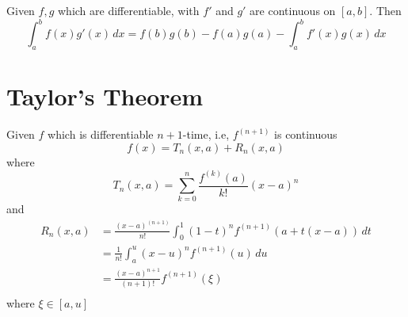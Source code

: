 \begin{theorem*}
  Given $f, g$ which are differentiable, with $f'$ and $g'$ are continuous on $[a, b]$.
  Then 
  \[\int_a^b f(x)g'(x)\,dx = f(b)g(b) - f(a)g(a) - \int_a^b f'(x)g(x)\,dx\]
\end{theorem*}

\section{Taylor's Theorem}
Given $f$ which is differentiable $n+1$-time, i.e, $f^{(n+1)}$ is continuous 
\[f(x) = T_n(x, a) + R_n(x, a)\]
where 
\[T_n(x, a) = \sum_{k=0}^{n} \frac{f^{(k)}(a)}{k!}(x-a)^n\]
and
\begin{align*}
  R_n(x, a) &= \frac{(x-a)^{(n+1)}}{n!}\int_0^1(1-t)^nf^{(n+1)}(a+t(x-a))\, dt \\
  &= \frac{1}{n!}\int_a^u(x-u)^nf^{(n+1)}(u)\, du \\
  &= \frac{(x-a)^{n+1}}{(n+1)!}f^{(n+1)}(\xi) \\
\end{align*}
where $\xi \in [a, u]$